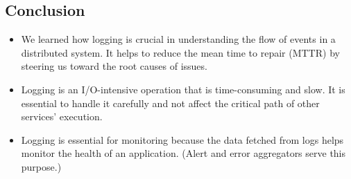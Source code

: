 \subsection{Conclusion}\label{m-tNY4snR8QznMZJ-wQ6c}

\begin{itemize}
\item
\protect{}\label{kQRFk5wZAkN9v3_L9GB-0}
We learned how logging is crucial in understanding the flow of events in a distributed system. It helps to reduce the mean time to repair (MTTR) by steering us toward the root causes of issues.
\item
\protect{}\label{dFgjMj0M_tVVC0cl8XEVc}
Logging is an I/O-intensive operation that is time-consuming and slow. It is essential to handle it carefully and not affect the critical path of other services' execution.
\item
\protect{}\label{d-UUuM_ruuGZC7YkeyxSG}
Logging is essential for monitoring because the data fetched from logs helps monitor the health of an application. (Alert and error aggregators serve this purpose.)
\end{itemize}

